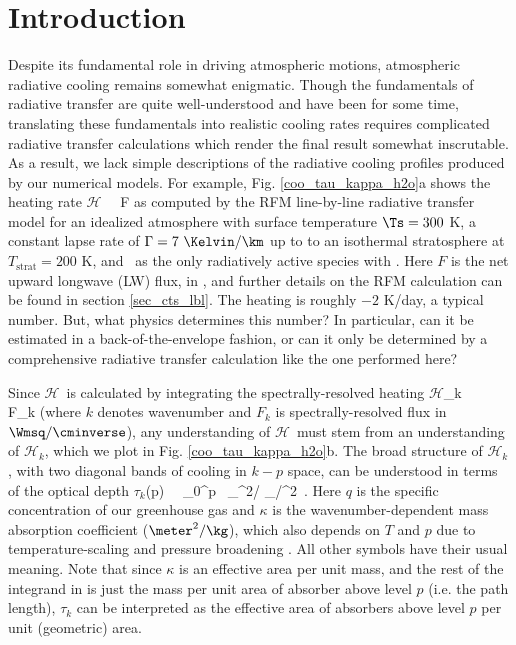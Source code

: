 \documentclass[10pt]{article}
\newcommand{\ch}{\ensuremath{\mathcal{H}}}
\newcommand{\chk}{\ensuremath{\ch_k}}
\newcommand{\tauk}{\ensuremath{\tau_k}}
\newcommand{\Tstrat}{\ensuremath{T_{\mathrm{strat}}}}
\begin{document}
\section {Introduction}
Despite its fundamental role in driving atmospheric motions, atmospheric radiative cooling remains somewhat enigmatic. Though the fundamentals of radiative transfer are quite well-understood and have been for some time, translating these fundamentals into realistic cooling rates requires complicated radiative transfer calculations which render the final result somewhat inscrutable. As a result, we lack simple descriptions of the radiative cooling profiles produced by our numerical models. For example, Fig. \ref{coo_tau_kappa_h2o}a shows the heating rate
\beqn
	\ch \ \equiv \  \ppp F \quad {}
	\label{heat}
\eeqn
as computed by the RFM line-by-line radiative transfer model \citep{dudhia2017} for an idealized atmosphere with surface temperature $\Ts=300$ K, a constant lapse rate of $\Gamma= 7\ \Kelvin/\km$ up to to an isothermal stratosphere at $\Tstrat=200$ K, and \htwo\ as the only radiatively active species  with  . Here $F$ is the net upward longwave (LW) flux, in \Wmsq, and further details on the RFM calculation can be found in section \ref{sec_cts_lbl}. The heating is roughly $-2$ K/day, a typical number. But, what physics determines this number? In particular, can it be estimated in a back-of-the-envelope fashion, or can it only be determined by a comprehensive radiative transfer calculation like the one performed here?

Since \ch\ is calculated by integrating the spectrally-resolved heating 
\beqn
	\ch_k \ \equiv \  \ppp F_k \quad {}
	\label{heat_k}
\eeqn
(where $k$ denotes wavenumber and $F_k$ is spectrally-resolved flux in $\Wmsq/\cminverse$),  any understanding of \ch\ must stem from an understanding of \chk, which we plot in Fig. \ref{coo_tau_kappa_h2o}b.  The broad structure of $\ch_k$, with two diagonal bands of cooling in $k-p$ space, can be understood in terms of the optical depth
\beqn
	\tauk(p) \ \equiv  \ \int_0^p \, _{\meter^2/\kg} _{\kg/\meter^2}\ .
	\label{tauk}
\eeqn
Here $q$ is the specific concentration of our greenhouse gas and $\kappa$ is the wavenumber-dependent mass absorption coefficient ($\meter^2/\kg$), which also depends on $T$ and $p$  due to temperature-scaling and pressure broadening \citep[][hereafter P10]{pierrehumbert2010}. All other symbols have their usual meaning. Note that since $\kappa$ is an effective area per unit mass, and the rest of the integrand in  is just the mass per unit area of absorber above level $p$ (i.e. the path length), $\tauk$ can be interpreted as the effective area of absorbers above level $p$ per unit (geometric) area.
\end{document}
